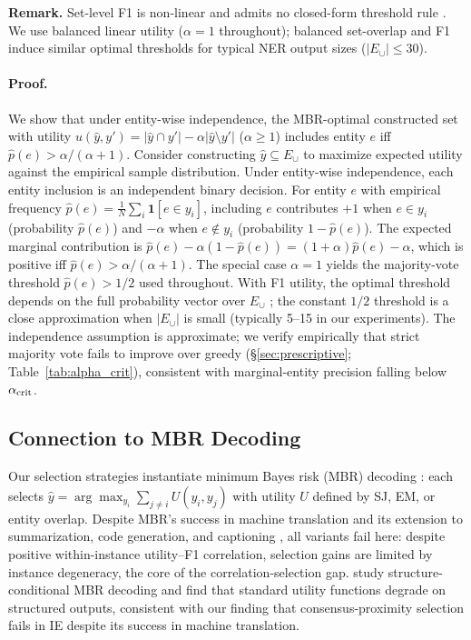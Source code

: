\noindent\textbf{Remark.}
Set-level F1 is non-linear and admits no closed-form threshold rule \cite{dembczynski2011exact}. We use balanced linear utility ($\alpha{=}1$ throughout); balanced set-overlap and F1 induce similar optimal thresholds for typical NER output sizes ($|E_\cup| \leq 30$).

\paragraph{Proof.}
We show that under entity-wise independence, the MBR-optimal constructed set with utility $u(\hat{y}, y') = |\hat{y} \cap y'| - \alpha|\hat{y} \setminus y'|$ ($\alpha \geq 1$) includes entity $e$ iff $\hat{p}(e) > \alpha/(\alpha+1)$.
Consider constructing $\hat{y} \subseteq E_\cup$ to maximize expected utility against the empirical sample distribution.
Under entity-wise independence, each entity inclusion is an independent binary decision.
For entity $e$ with empirical frequency $\hat{p}(e) = \frac{1}{N} \sum_i \mathbf{1}[e \in y_i]$, including $e$ contributes $+1$ when $e \in y_i$ (probability $\hat{p}(e)$) and $-\alpha$ when $e \notin y_i$ (probability $1{-}\hat{p}(e)$).
The expected marginal contribution is $\hat{p}(e) - \alpha(1{-}\hat{p}(e)) = (1{+}\alpha)\hat{p}(e) - \alpha$, which is positive iff $\hat{p}(e) > \alpha/(\alpha+1)$.
The special case $\alpha{=}1$ yields the majority-vote threshold $\hat{p}(e) > 1/2$ used throughout.
With F1 utility, the optimal threshold depends on the full probability vector over $E_\cup$ \cite{dembczynski2011exact}; the constant $1/2$ threshold is a close approximation when $|E_\cup|$ is small (typically 5--15 in our experiments).
The independence assumption is approximate; we verify empirically that strict majority vote fails to improve over greedy (\S\ref{sec:prescriptive}; Table~\ref{tab:alpha_crit}), consistent with marginal-entity precision falling below $\alpha_{\textup{crit}}$.

\subsection{Connection to MBR Decoding}\label{app:mbr_connection}

Our selection strategies instantiate minimum Bayes risk (MBR) decoding \cite{eikema2022sampling, muller2021understanding}: each selects $\hat{y} = \arg\max_{y_i} \sum_{j \neq i} U(y_i, y_j)$ with utility $U$ defined by SJ, EM, or entity overlap.
Despite MBR's success in machine translation \cite{freitag2022high} and its extension to summarization, code generation, and captioning \cite{jinnai2024mbr}, all variants fail here: despite positive within-instance utility--F1 correlation, selection gains are limited by instance degeneracy, the core of the correlation-selection gap.
\citet{eikema2025structured} study structure-conditional MBR decoding and find that standard utility functions degrade on structured outputs, consistent with our finding that consensus-proximity selection fails in IE despite its success in machine translation.

